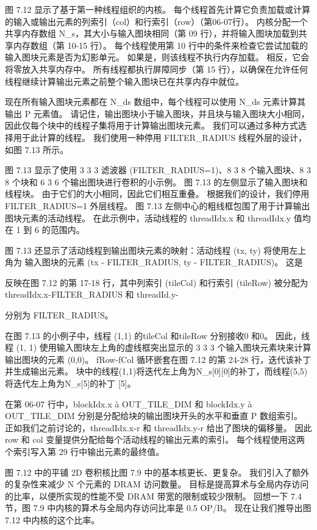 图 7.12 显示了基于第一种线程组织的内核。 每个线程首先计算它负责加载或计算的输入或输出元素的列索引（col）和行索引（row）（第06-07行）。 内核分配一个共享内存数组 N\_s，其大小与输入图块相同（第 09 行），并将输入图块加载到共享内存数组（第 10-15 行）。 每个线程使用第 10 行中的条件来检查它尝试加载的输入图块元素是否为幻影单元。 如果是，则该线程不执行内存加载。 相反，它会将零放入共享内存中。 所有线程都执行屏障同步（第 15 行），以确保在允许任何线程继续计算输出元素之前整个输入图块已在共享内存中就位。

现在所有输入图块元素都在 N\_ds 数组中，每个线程可以使用 N\_ds 元素计算其输出 P 元素值。 请记住，输出图块小于输入图块，并且块与输入图块大小相同，因此仅每个块中的线程子集将用于计算输出图块元素。 我们可以通过多种方式选择用于此计算的线程。 我们使用一种停用 FILTER\_RADIUS 线程外层的设计，如图 7.13 所示。

图 7.13 显示了使用 3 3 3 滤波器 (FILTER\_RADIUS=1)、8 3 8 个输入图块、8 3 8 个块和 6 3 6 个输出图块进行卷积的小示例。 图 7.13 的左侧显示了输入图块和线程块。 由于它们的大小相同，因此它们相互重叠。 根据我们的设计，我们停用 FILTER\_RADIUS=1 外层线程。 图 7.13 左侧中心的粗线框包围了用于计算输出图块元素的活动线程。 在此示例中，活动线程的 threadIdx.x 和 threadIdx.y 值均在 1 到 6 的范围内。

图 7.13 还显示了活动线程到输出图块元素的映射：活动线程 (tx, ty) 将使用左上角为 输入图块的元素 (tx - FILTER\_RADIUS, ty - FILTER\_RADIUS)。 这是

反映在图 7.12 的第 17-18 行，其中列索引 (tileCol) 和行索引 (tileRow) 被分配为 threadIdx.x-FILTER\_RADIUS 和 threadId.y-

分别为 FILTER\_RADIUS。

在图 7.13 的小例子中，线程 (1,1) 的tileCol 和tileRow 分别接收0 和0。 因此，线程 (1, 1) 使用输入图块左上角的虚线框突出显示的 3 3 3 个输入图块元素块来计算输出图块的元素 (0,0)。 fRow-fCol 循环嵌套在图 7.12 的第 24-28 行，迭代该补丁并生成输出元素。 块中的线程(1,1)将迭代左上角为N\_s[0][0]的补丁，而线程(5,5)将迭代左上角为N\_s[5]的补丁 [5]。

在第 06-07 行中，blockIdx.x à OUT\_TILE\_DIM 和 blockIdx.y à OUT\_TILE\_DIM 分别是分配给块的输出图块开头的水平和垂直 P 数组索引。 正如我们之前讨论的，threadIdx.x-r 和 threadIdx.y-r 给出了图块的偏移量。 因此 row 和 col 变量提供分配给每个活动线程的输出元素的索引。 每个线程使用这两个索引写入第 29 行中输出元素的最终值。

图 7.12 中的平铺 2D 卷积核比图 7.9 中的基本核更长、更复杂。 我们引入了额外的复杂性来减少 N 个元素的 DRAM 访问数量。 目标是提高算术与全局内存访问的比率，以便所实现的性能不受 DRAM 带宽的限制或较少限制。 回想一下 7.4 节，图 7.9 中内核的算术与全局内存访问比率是 0.5 OP/B。 现在让我们推导出图 7.12 中内核的这个比率。

